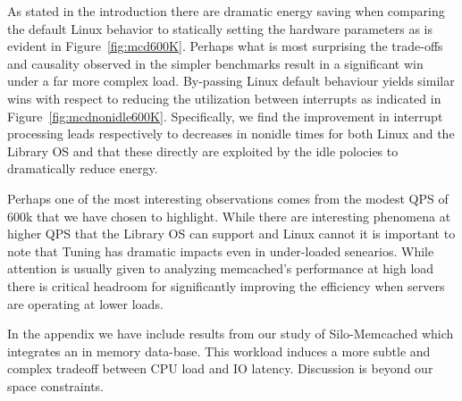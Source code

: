 As stated in the introduction there are dramatic energy saving when comparing the default Linux behavior to statically setting the hardware parameters as is evident in Figure~\ref{fig:mcd600K}.  Perhaps what is most surprising the trade-offs and causality observed in the simpler benchmarks result in a significant win under a far more complex load.  By-passing Linux default behaviour yields similar wins with respect to reducing the utilization between interrupts as indicated in Figure~\ref{fig:mcdnonidle600K}. Specifically, we find the improvement in interrupt processing leads respectively to decreases in nonidle times for both Linux and the Library OS and that these directly are exploited by the idle polocies to dramatically reduce energy.  

Perhaps one of the most interesting observations comes from the modest QPS of 600k that we have chosen to highlight.   While there are interesting phenomena at higher QPS that the Library OS can support and Linux cannot it is important to note that Tuning has dramatic impacts even in under-loaded senearios.  While attention is usually given to analyzing memcached's performance at high load there is critical headroom for significantly improving the efficiency when servers are operating at lower loads.    

In the appendix we have include results from our study of Silo-Memcached which integrates an in memory data-base.  This workload induces a more subtle and complex tradeoff between CPU load and IO latency.  Discussion is beyond our space constraints.  




